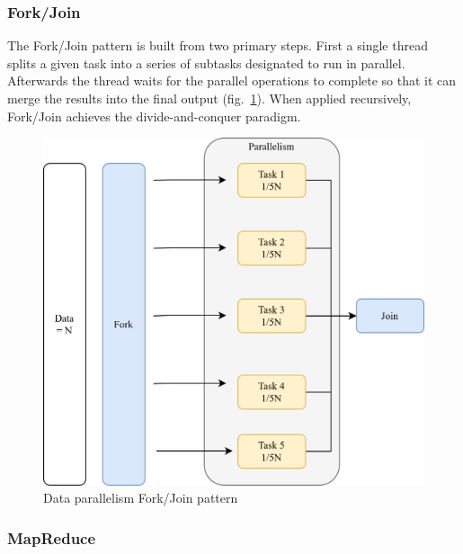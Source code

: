 \subsubsection{Fork/Join}
\label{sec:ForkJoin}
The Fork/Join pattern is built from two primary steps. First a single thread splits a given task into a series of subtasks designated to run in parallel. Afterwards the thread waits for the parallel operations to complete so that it can merge the results into the final output (fig.~\ref{fig:ForkJoin}). When applied recursively, Fork/Join achieves the divide-and-conquer paradigm.
\begin{figure}[htb]
	\centering
		\includegraphics[scale=1.0]{figures02/forkjoin.png}
		\caption{Data parallelism Fork/Join pattern}
		\label{fig:ForkJoin}
\end{figure}

\subsubsection{MapReduce}
\label{sec:MapReduce}

